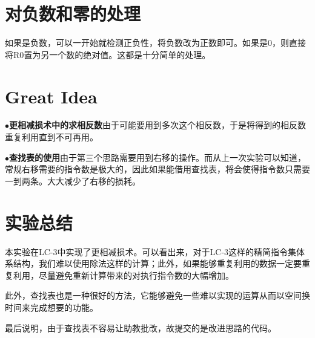 \documentclass[UTF8]{article}
\newcommand{\keypointt}[2]{$\bullet$\textbf{#1}\quad#2\par}
\begin{document}
	\section{对负数和零的处理}
	如果是负数，可以一开始就检测正负性，将负数改为正数即可。如果是0，则直接将R0置为另一个数的绝对值。这都是十分简单的处理。\par
	
	
	\section{Great Idea}
	\keypointt{更相减损术中的求相反数}{由于可能要用到多次这个相反数，于是将得到的相反数重复利用直到不可再用。}
	\keypointt{查找表的使用}{由于第三个思路需要用到右移的操作。而从上一次实验可以知道，常规右移需要的指令数是极大的，因此如果能借用查找表，将会使得指令数只需要一到两条。大大减少了右移的损耗。}
	
	\section{实验总结}
	本实验在LC-3中实现了更相减损术。可以看出来，对于LC-3这样的精简指令集体系结构，我们难以使用除法这样的计算；此外，如果能够重复利用的数据一定要重复利用，尽量避免重新计算带来的对执行指令数的大幅增加。\par
	此外，查找表也是一种很好的方法，它能够避免一些难以实现的运算从而以空间换时间来完成想要的功能。\par
	最后说明，由于查找表不容易让助教批改，故提交的是改进思路的代码。\par
	
	
	
	
	
	
\end{document}
